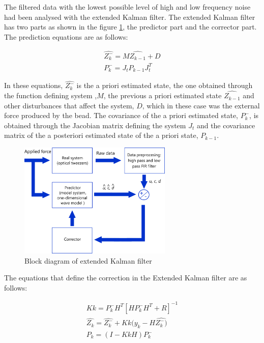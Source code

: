 \documentclass[12pt, a4paper]{article} %
\begin{document}
The filtered data with the lowest possible level of high and low frequency noise had been analysed with the extended Kalman filter. The extended Kalman filter has two parts as shown in the figure \ref{fig:kalman_esq}, the predictor part and the corrector part. The prediction equations are as follows:

\setlength{\parskip}{4mm}

\begin{equation} \label{eqn:predictor}
    \begin{array}{ l }

    \hat{Z_{k}^{-}} = M\hat{Z_{k-1}} + D \\
    P_{k}^{-} = J_{t}P_{k-1}J_{t}^{T}
    
    \end{array}
\end{equation}

In these equations, $\hat{Z_{k}^{-}}$ is the a priori estimated state, the one obtained through the function defining system ,$M$, the previous a priori estimated state $\hat{Z_{k-1}}$ and other disturbances that affect the system, $D$, which in these case was the external force produced by the bead.
The covariance of the a priori estimated state, $P_{k}^{-}$, is obtained through the Jacobian matrix defining the system $J_{t}$ and the covariance matrix of the a posteriori estimated state of the a priori state, $P_{k-1}$.

\begin{figure}[htbp]
	\centering
	\includegraphics[width=0.65\textwidth]{figures/esquema_extended_kalman_filter.png}
	\caption{Block diagram of extended Kalman filter}
	\label{fig:kalman_esq}
\end{figure}

The equations that define the correction in the Extended Kalman filter are as follows:

\begin{equation} \label{eqn:corrector}
    \begin{array}{ l }
    
    Kk = P_{k}^{-}H^{T}[HP_{k}^{-}H^{T} + R]^{-1} \\
    \hat{Z_{k}} = \hat{Z_{k}^{-}} + Kk(y_{k}-H\hat{Z_{k}^{-})} \\
    P_{k} = (I - KkH)P_{k}^{-}
    
    \end{array}
\end{equation}
\end{document}
